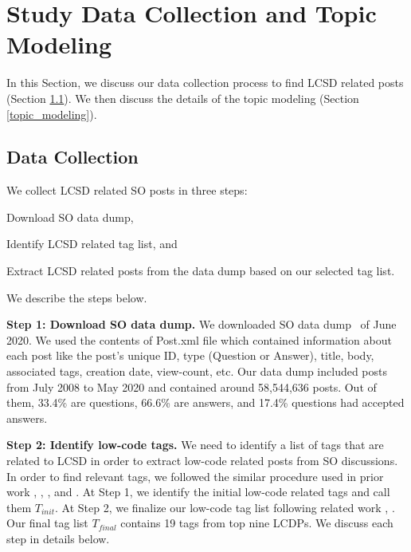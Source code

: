 \section{Study Data Collection and Topic Modeling} \label{sec:methodology}
In this Section, we discuss our data collection process to find  LCSD related posts (Section \ref{data_collection}). We then discuss the details of the topic modeling (Section \ref{topic_modeling}).
 
\subsection{Data Collection} \label{data_collection}
We collect  LCSD related SO posts in three steps: \begin{inparaenum}[(1)]
\item Download SO data dump,
\item Identify  LCSD related tag list, and
\item Extract  LCSD related posts from the data dump based on our selected tag list.
\end{inparaenum} We describe the steps below.

\nd\textbf{Step 1: Download SO data dump.} We downloaded SO data dump~\cite{SOdump} of June 2020. We used the contents of Post.xml file which contained information about each post like the post's unique ID, type (Question or Answer), title, body, associated tags, creation date, view-count, etc. Our data dump included posts from July 2008 to May 2020 and contained around 58,544,636 posts. Out of them, 33.4\% are questions, 66.6\% are answers, and 17.4\% questions had accepted answers.

\nd\textbf{Step 2: Identify low-code tags.}
We need to identify a list of tags that are related to LCSD in order to extract low-code related posts from SO discussions.
In order to find relevant tags, we followed the similar procedure used in prior work \cite{abdellatif2020challenges}, \cite{ahmed2018concurrency}, \cite{wan2019discussed}, and \cite{linares2013exploratory}. At Step 1, we identify the initial low-code related tags and call them $T_{init}$. At Step 2, we finalize our low-code tag list following related work \cite{bagherzadeh2019going}, \cite{yang2016security}. Our final tag list $T_{final}$ contains 19 tags from top nine LCDPs. We discuss each step in details below.

